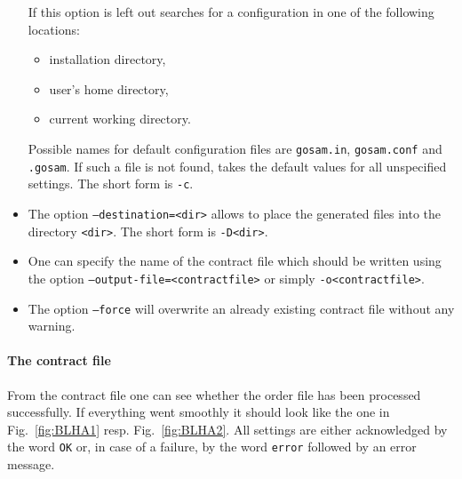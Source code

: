 \begin{itemize}
   If  this option is left out \gosam{} searches for a configuration
   in one of the following locations:
   \begin{itemize}
   \item \gosam{} installation directory,
   \item user's home directory,
   \item current working directory.
   \end{itemize}
   Possible names for default configuration files are \texttt{gosam.in},
   \texttt{gosam.conf} and \texttt{.gosam}. 
   If such a file is not found, \gosam{} takes the default values for 
   all unspecified settings.
   The short form is \texttt{-c}.
\item  The option \texttt{--destination=<dir>} allows 
   to place the generated files into the directory \texttt{<dir>}.
   The short form is \texttt{-D<dir>}.
\item One can specify the name of the contract file which should be written
   using the option \texttt{--output-file=<contractfile>} or simply
   \texttt{-o<contractfile>}.
\item The option \texttt{--force} will overwrite an already existing
   contract file without any warning. 
\end{itemize}

\paragraph{The contract file}
From the contract file one can see whether the order file has been processed successfully.
If everything went smoothly it should look like the one in Fig.~\ref{fig:BLHA1}
resp. Fig.~\ref{fig:BLHA2}.
All settings are either acknowledged by the word \texttt{OK} or, in case
of a failure, by the word \texttt{error} followed by an error message.


